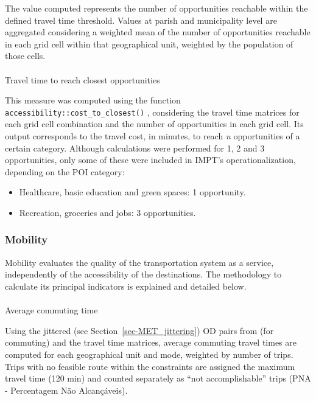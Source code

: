 \documentclass[
  authoryear,
  review,
  1p]{elsarticle}
\makeatletter
\let\oldparagraph\paragraph
\renewcommand{\paragraph}{
    \@ifstar
      \xxxParagraphStar
      \xxxParagraphNoStar
  }
\newcommand{\xxxParagraphStar}[1]{\oldparagraph*{#1}\mbox{}}
\newcommand{\xxxParagraphNoStar}[1]{\oldparagraph{#1}\mbox{}}
\makeatother
\begin{document}
The value computed represents the number of opportunities reachable
within the defined travel time threshold. Values at parish and
municipality level are aggregated considering a weighted mean of the
number of opportunities reachable in each grid cell within that
geographical unit, weighted by the population of those cells.

\paragraph{Travel time to reach closest
opportunities}\label{sec-MET_TTopportunities}

This measure was computed using the function
\texttt{accessibility::cost\_to\_closest()}
\citep{Pereira_accessibility_2022} , considering the travel time
matrices for each grid cell combination and the number of opportunities
in each grid cell. Its output corresponds to the travel cost, in
minutes, to reach \emph{n} opportunities of a certain category. Although
calculations were performed for 1, 2 and 3 opportunities, only some of
these were included in IMPT's operationalization, depending on the POI
category:

\begin{itemize}
\item
  Healthcare, basic education and green spaces: 1 opportunity.
\item
  Recreation, groceries and jobs: 3 opportunities.
\end{itemize}

\subsubsection{Mobility}\label{sec-MET_mobility}

Mobility evaluates the quality of the transportation system as a
service, independently of the accessibility of the destinations. The
methodology to calculate its principal indicators is explained and
detailed below.

\paragraph{Average commuting time}\label{average-commuting-time}

Using the jittered (see Section~\ref{sec-MET_jittering}) OD pairs from
\citet{INE_IMOB2017} (for commuting) and the travel time matrices,
average commuting travel times are computed for each geographical unit
and mode, weighted by number of trips. Trips with no feasible route
within the constraints are assigned the maximum travel time (120 min)
and counted separately as ``not accomplishable'' trips (PNA -
Percentagem Não Alcançáveis).
\end{document}
